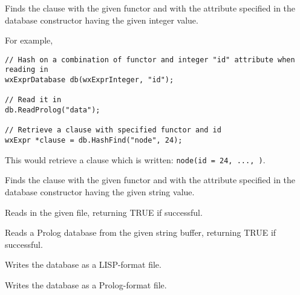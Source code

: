 
Finds the clause with the given functor and with the attribute specified
in the database constructor having the given integer value.

For example,

\begin{verbatim}
// Hash on a combination of functor and integer "id" attribute when reading in
wxExprDatabase db(wxExprInteger, "id");

// Read it in
db.ReadProlog("data");

// Retrieve a clause with specified functor and id
wxExpr *clause = db.HashFind("node", 24);
\end{verbatim}

This would retrieve a clause which is written: {\tt node(id = 24, ..., )}.


Finds the clause with the given functor and with the attribute specified
in the database constructor having the given string value.

\label{wxexprdatabaseread}


Reads in the given file, returning TRUE if successful.

\label{wxexprdatabasereadfromstring}


Reads a Prolog database from the given string buffer, returning TRUE if
successful.

\label{wxexprdatabasewritelisp}


Writes the database as a LISP-format file.

\label{wxexprdatabasewrite}



Writes the database as a Prolog-format file.


